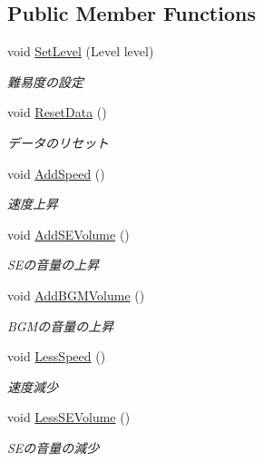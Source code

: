 \subsection*{Public Member Functions}
\begin{DoxyCompactItemize}
\item 
void \hyperlink{class_play_data_a67575e29933665c60e5f60135875bb69}{Set\+Level} (Level level)
\begin{DoxyCompactList}\small\item\em 難易度の設定 \end{DoxyCompactList}\item 
void \hyperlink{class_play_data_a3840f7faaa54b86ff3ec207ef85b7033}{Reset\+Data} ()
\begin{DoxyCompactList}\small\item\em データのリセット \end{DoxyCompactList}\item 
void \hyperlink{class_play_data_af935b9627b1aed55166d3b67433d1c04}{Add\+Speed} ()
\begin{DoxyCompactList}\small\item\em 速度上昇 \end{DoxyCompactList}\item 
void \hyperlink{class_play_data_a3daf8700808d898b695b4394d5086113}{Add\+S\+E\+Volume} ()
\begin{DoxyCompactList}\small\item\em S\+Eの音量の上昇 \end{DoxyCompactList}\item 
void \hyperlink{class_play_data_a22fd27b0cd3c566ceb2383db1ff01583}{Add\+B\+G\+M\+Volume} ()
\begin{DoxyCompactList}\small\item\em B\+G\+Mの音量の上昇 \end{DoxyCompactList}\item 
void \hyperlink{class_play_data_a3aaf96876ca0992bc7170d81725de4dc}{Less\+Speed} ()
\begin{DoxyCompactList}\small\item\em 速度減少 \end{DoxyCompactList}\item 
void \hyperlink{class_play_data_afa4ccf849600e4cd54da901338f537af}{Less\+S\+E\+Volume} ()
\begin{DoxyCompactList}\small\item\em S\+Eの音量の減少 \end{DoxyCompactList}\item 

\end{DoxyCompactItemize}
